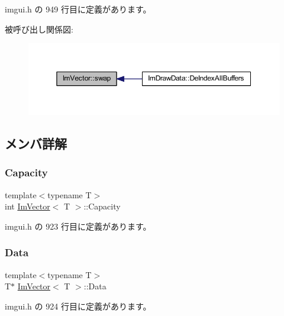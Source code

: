  imgui.\+h の 949 行目に定義があります。

被呼び出し関係図\+:\nopagebreak
\begin{figure}[H]
\begin{center}
\leavevmode
\includegraphics[width=350pt]{class_im_vector_afcec0d2a1e28aebe412b6efd06f0a77a_icgraph}
\end{center}
\end{figure}


\subsection{メンバ詳解}
\mbox{\label{class_im_vector_abd24482b4d30d22e37582e521e5bfb33}} 
\subsubsection{\texorpdfstring{Capacity}{Capacity}}
{\footnotesize\ttfamily template$<$typename T$>$ \\
int \mbox{\hyperlink{class_im_vector}{Im\+Vector}}$<$ T $>$\+::Capacity}



 imgui.\+h の 923 行目に定義があります。

\mbox{\label{class_im_vector_ac0e46e8b30cb079d93c8f0aad7d7cbd0}} 
\subsubsection{\texorpdfstring{Data}{Data}}
{\footnotesize\ttfamily template$<$typename T$>$ \\
T$\ast$ \mbox{\hyperlink{class_im_vector}{Im\+Vector}}$<$ T $>$\+::Data}



 imgui.\+h の 924 行目に定義があります。

\mbox{\label{class_im_vector_abbfd157947f66280d27b21d70a16df8d}} 
